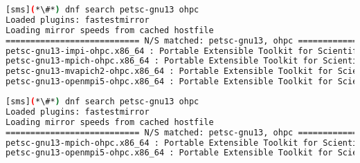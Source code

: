\begin{lstlisting}[language=bash,keywords={}]
[sms](*\#*) dnf search petsc-gnu13 ohpc
Loaded plugins: fastestmirror
Loading mirror speeds from cached hostfile
=========================== N/S matched: petsc-gnu13, ohpc ===========================
petsc-gnu13-impi-ohpc.x86_64 : Portable Extensible Toolkit for Scientific Computation
petsc-gnu13-mpich-ohpc.x86_64 : Portable Extensible Toolkit for Scientific Computation
petsc-gnu13-mvapich2-ohpc.x86_64 : Portable Extensible Toolkit for Scientific Computation
petsc-gnu13-openmpi5-ohpc.x86_64 : Portable Extensible Toolkit for Scientific Computation
\end{lstlisting}
\fi

\begin{lstlisting}[language=bash,keywords={}]
[sms](*\#*) dnf search petsc-gnu13 ohpc
Loaded plugins: fastestmirror
Loading mirror speeds from cached hostfile
=========================== N/S matched: petsc-gnu13, ohpc ===========================
petsc-gnu13-mpich-ohpc.x86_64 : Portable Extensible Toolkit for Scientific Computation
petsc-gnu13-openmpi5-ohpc.x86_64 : Portable Extensible Toolkit for Scientific Computation
\end{lstlisting}
\fi

